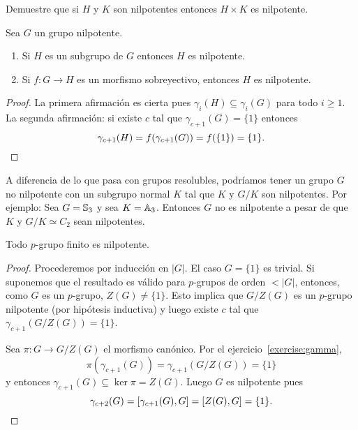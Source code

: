 \begin{exercise}
	\label{xca:HxK_nilpotente}
	Demuestre que si $H$ y $K$ son nilpotentes entonces $H\times K$ es
	nilpotente.
\end{exercise}

\begin{theorem}
	\label{theorem:nilpotente}
	Sea $G$ un grupo nilpotente.
	\begin{enumerate}
		\item Si $H$ es un subgrupo de $G$ entonces $H$ es nilpotente.
		\item Si $f\colon G\to H$ es un morfismo sobreyectivo, entonces $H$ es
			nilpotente. 
	\end{enumerate}
\end{theorem}

\begin{proof}
	La primera afirmación es cierta pues $\gamma_i(H)\subseteq\gamma_i(G)$ para
	todo $i\geq1$. La segunda afirmación: si existe $c$ tal que $\gamma_{c+1}(G)=\{1\}$
	entonces \[
	\gamma_{c+1}(H)=f(\gamma_{c+1}(G))=f(\{1\})=\{1\}.\qedhere
	\]
\end{proof}

\begin{example}
	A diferencia de lo que pasa con grupos resolubles, podríamos tener un grupo
	$G$ no nilpotente con un subgrupo normal $K$ tal que $K$ y $G/K$ son
	nilpotentes. Por ejemplo: Sea $G=\mathbb{S}_3$ y sea $K=\mathbb{A}_3$. Entonces $G$ no
	es nilpotente a pesar de que $K$ y $G/K\simeq C_2$ sean nilpotentes.
\end{example}

\begin{proposition}
	\label{proposition:pgrupo_nilpotente}
	Todo $p$-grupo finito es nilpotente.
\end{proposition}

\begin{proof}
	Procederemos por inducción en $|G|$. El caso $G=\{1\}$ es trivial. Si suponemos
	que el resultado es válido para $p$-grupos de orden $<|G|$, entonces, como
	$G$ es un $p$-grupo, $Z(G)\ne\{1\}$. Esto implica que $G/Z(G)$ es un $p$-grupo
	nilpotente (por hipótesis inductiva) y luego existe $c$ tal que
	$\gamma_{c+1}(G/Z(G))=\{1\}$. 
	
	Sea $\pi\colon G\to G/Z(G)$ el morfismo canónico.
	Por el ejercicio~\ref{exercise:gamma},
	\[
	\pi(\gamma_{c+1}(G))=\gamma_{c+1}(G/Z(G))=\{1\}
	\]
	y entonces
	$\gamma_{c+1}(G)\subseteq \ker\pi=Z(G)$. Luego $G$ es nilpotente pues 
	\[
		\gamma_{c+2}(G)=[\gamma_{c+1}(G),G]=[Z(G),G]=\{1\}.\qedhere
	\]
\end{proof}

